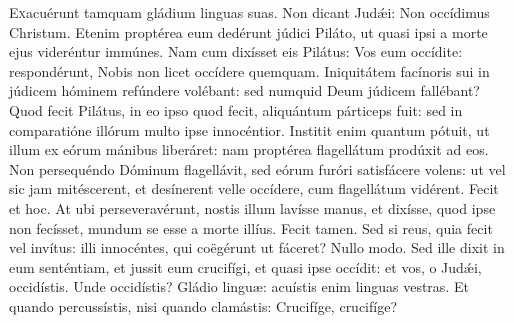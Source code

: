 
\lettrine{E}{x}acuérunt tamquam gládium linguas suas. Non dicant Judǽi: Non occídimus Christum. Etenim proptérea eum dedérunt júdici Piláto, ut quasi ipsi a morte ejus videréntur immúnes. Nam cum dixísset eis Pilátus: Vos eum occídite: respondérunt, Nobis non licet occídere quemquam. Iniquitátem facínoris sui in júdicem hóminem refúndere volébant: sed numquid Deum júdicem fallébant? Quod fecit Pilátus, in eo ipso quod fecit, aliquántum párticeps fuit: sed in comparatióne illórum multo ipse innocéntior. Institit enim quantum pótuit, ut illum ex eórum mánibus liberáret: nam proptérea flagellátum prodúxit ad eos. Non persequéndo Dóminum flagellávit, sed eórum furóri satisfácere volens: ut vel sic jam mitéscerent, et desínerent velle occídere, cum flagellátum vidérent. Fecit et hoc. At ubi perseveravérunt, nostis illum lavísse manus, et dixísse, quod ipse non fecísset, mundum se esse a morte illíus. Fecit tamen. Sed si reus, quia fecit vel invítus: illi innocéntes, qui coëgérunt ut fáceret? Nullo modo. Sed ille dixit in eum senténtiam, et jussit eum crucifígi, et quasi ipse occídit: et vos, o Judǽi, occidístis. Unde occidístis? Gládio linguæ: acuístis enim linguas vestras. Et quando percussístis, nisi quando clamástis: Crucifíge, crucifíge?